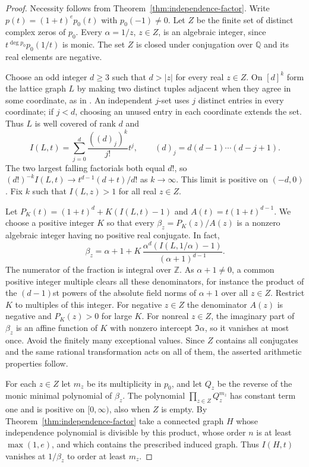 \documentclass[11pt,a4paper]{article}
\begin{document}
\begin{proof}
Necessity follows from Theorem~\ref{thm:independence-factor}.
Write $p(t)=(1+t)^e p_0(t)$ with $p_0(-1)\ne0$.
Let $Z$ be the finite set of distinct complex zeros of $p_0$.
Every $\alpha=1/z$, $z\in Z$, is an algebraic integer, since
$t^{\deg p_0}p_0(1/t)$ is monic. The set $Z$ is closed under conjugation
over $\mathbb Q$ and its real elements are negative.

Choose an odd integer $d\ge3$ such that $d>|z|$ for every real
$z\in Z$. On $[d]^k$ form the lattice graph $L$ by making two distinct
tuples adjacent when they agree in some coordinate, as in \cite{brown2004}.
An independent $j$-set uses $j$ distinct entries in every coordinate;
if $j<d$, choosing an unused entry in each coordinate extends the set.
Thus $L$ is well covered of rank $d$ and
\[
 I(L,t)=\sum_{j=0}^{d} \frac{((d)_j)^k}{j!}t^j,
 \qquad (d)_j=d(d-1)\cdots(d-j+1).
\]
The two largest falling factorials both equal $d!$, so
$(d!)^{-k} I(L,t)\to t^{d-1}(d+t)/d!$ as $k\to\infty$.
This limit is positive on $(-d,0)$. Fix $k$ such that
$I(L,z)>1$ for all real $z\in Z$.

Let $P_K(t)=(1+t)^d+K(I(L,t)-1)$ and $A(t)=t(1+t)^{d-1}$.
We choose a positive integer $K$ so that every $\beta_z=P_K(z)/A(z)$ is
a nonzero algebraic integer having no positive real conjugate. In fact,
\[
 \beta_z=\alpha+1+
 K\,\frac{\alpha^d(I(L,1/\alpha)-1)}{(\alpha+1)^{d-1}}.
\]
The numerator of the fraction is integral over $\mathbb Z$.
As $\alpha+1\ne0$, a common positive integer multiple clears all these
denominators, for instance the product of the $(d-1)$st powers of the
absolute field norms of $\alpha+1$ over all $z\in Z$.
Restrict $K$ to multiples of this integer. For negative $z\in Z$ the
denominator $A(z)$ is negative and $P_K(z)>0$ for large $K$.
For nonreal $z\in Z$, the imaginary part of $\beta_z$ is an affine
function of $K$ with nonzero intercept $\Im\alpha$, so it vanishes at
most once. Avoid the finitely many exceptional values. Since $Z$ contains
all conjugates and the same rational transformation acts on all of them,
the asserted arithmetic properties follow.

For each $z\in Z$ let $m_z$ be its multiplicity in $p_0$, and let
$Q_z$ be the reverse of the monic minimal polynomial of $\beta_z$.
The polynomial $\prod_{z\in Z}Q_z^{m_z}$ has constant term one and is
positive on $[0,\infty)$, also when $Z$ is empty. By
Theorem~\ref{thm:independence-factor} take a connected graph $H$ whose
independence polynomial is divisible by this product, whose order $n$ is
at least $\max(1,e)$, and which contains the prescribed induced graph.
Thus $I(H,t)$ vanishes at $1/\beta_z$ to order at least $m_z$.


\end{proof}
\end{document}
